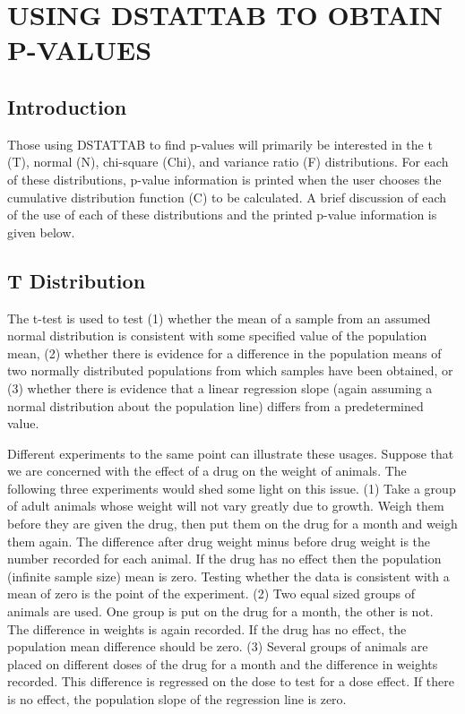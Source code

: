 \documentclass[12pt,dvips]{article}
\newcommand{\mysection}[1]
    {\color{blue} \section{#1} \color{black}}
\newcommand{\mysubsection}[1]
    {\color{green}\subsection{#1}\color{black}}
\begin{document}
\mysection{ USING DSTATTAB TO OBTAIN P-VALUES}
     
\mysubsection{Introduction}
     
     Those using DSTATTAB to find p-values  will primarily be interested in
     the t (T),  normal  (N), chi-square (Chi),  and   variance  ratio  (F)
     distributions.  For  each of  these distributions, p-value information
     is printed when the user chooses the cumulative  distribution function
     (C) to be calculated.  A brief discussion  of  each of the use of each
     of  these distributions and  the printed p-value information  is given
     below.
     
\mysubsection{T Distribution}
     
     The t-test is used to test  (1)  whether the mean  of a sample from an
     assumed normal distribution is consistent with some specified value of
     the population mean, (2) whether there is evidence for a difference in
     the  population means  of  two  normally  distributed populations from
     which samples  have been obtained, or  (3)  whether there  is evidence
     that a  linear regression slope (again assuming  a normal distribution
     about the population line) differs from a predetermined value.
          
     Different experiments to the same  point can  illustrate these usages.
     Suppose that we are concerned with the effect of a  drug on the weight
     of animals.  The following three  experiments would shed some light on
     this issue.  (1) Take  a group of adult animals  whose weight will not
     vary greatly due  to  growth.  Weigh  them before they  are given  the
     drug, then put them on the drug for a month and weigh them again.  The
     difference after drug  weight  minus before drug  weight is the number
     recorded  for  each animal.   If   the drug  has no  effect  then  the
     population (infinite  sample size) mean is zero.   Testing whether the
     data is consistent with a mean of zero is the point of the experiment.
     (2) Two equal sized groups of animals  are used.  One group is  put on
     the drug for a month, the other is not.  The  difference in weights is
     again  recorded.  If  the  drug has no   effect,  the population  mean
     difference should be  zero.  (3) Several  groups of animals are placed
     on  different  doses of the  drug  for a month   and the difference in
     weights recorded.  This  difference is  regressed on  the dose to test
     for a dose effect.  If there is no effect, the population slope of the
     regression line is zero.
     
\end{document}
